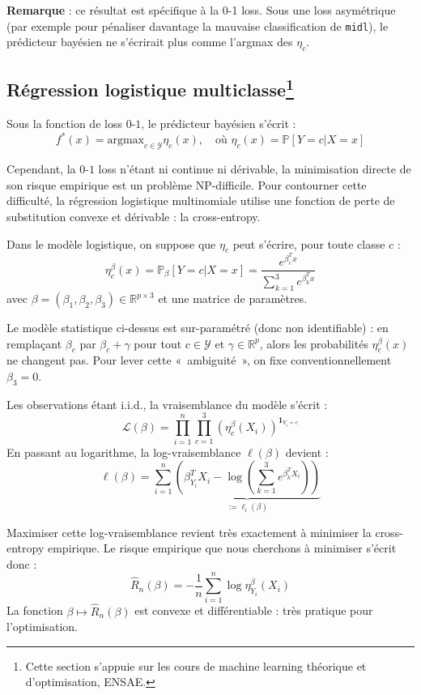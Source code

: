 \documentclass[a4paper,11pt]{paper}
\theoremstyle{plain}
\theoremstyle{definition}
\theoremstyle{remark}
\begin{document}
\textbf{Remarque} : ce résultat est spécifique à la 0-1 loss. Sous une loss asymétrique (par exemple pour pénaliser davantage la mauvaise classification de \texttt{midl}), le prédicteur bayésien ne s'écrirait plus comme l'argmax des $\eta_c$.


\subsection{Régression logistique multiclasse\texorpdfstring{\protect\footnote{Cette section s'appuie sur les cours de machine learning théorique et d'optimisation, ENSAE.}}{}}
\label{sec:logreg}

Sous la fonction de loss $0$-$1$, le prédicteur bayésien s'écrit :
$$f^*(x) = \text{argmax}_{c \in \mathcal{Y}} \eta_c(x), \quad \text{où } \eta_c(x) = \mathbb{P}[Y = c | X = x]$$

Cependant, la $0$-$1$ loss n'étant ni continue ni dérivable, la minimisation directe de son risque empirique est un problème NP-difficile. Pour contourner cette difficulté, la régression logistique multinomiale utilise une fonction de perte de substitution convexe et dérivable : la cross-entropy.

Dans le modèle logistique, on suppose que $\eta_c$ peut s'écrire, pour toute classe $c$ :
$$\eta_c^\beta(x) = \mathbb P_\beta[ Y = c| X =x ] = \dfrac{e^{\beta_c^T x}}{\sum_{k=1}^3e^{\beta_k^Tx}}$$
avec $\beta  = (\beta_1, \beta_2, \beta_3) \in \mathbb R^{p \times 3}$ et une matrice de paramètres.

Le modèle statistique ci-dessus est sur-paramétré (donc non identifiable) : en remplaçant $\beta_c$ par $\beta_c + \gamma$ pour tout $c \in \mathcal Y$ et $\gamma \in \mathbb R^p$, alors les probabilités $\eta_c^\beta(x)$ ne changent pas. Pour lever cette «~ambiguité~», on fixe conventionnellement $\beta_3 = 0$.

Les observations étant i.i.d., la vraisemblance du modèle s'écrit :
$$\mathcal{L}(\beta) = \prod_{i=1}^n \prod_{c=1}^3 (\eta_c^\beta(X_i))^{\mathbf{1}_{Y_i=c}}$$
En passant au logarithme, la log-vraisemblance $\ell(\beta)$ devient :
$$\ell(\beta) = \sum_{i=1}^n \underbrace{\left( \beta_{Y_i}^T X_i - \log\left(\sum_{k=1}^3 e^{\beta_k^T X_i}\right) \right)}_{:= \ell_i(\beta)}$$

Maximiser cette log-vraisemblance revient très exactement à minimiser la cross-entropy empirique. Le risque empirique que nous cherchons à minimiser s'écrit donc :
$$\hat{R}_n(\beta) = -\frac{1}{n} \sum_{i=1}^n \log \eta_{Y_i}^\beta(X_i)$$
La fonction $\beta \mapsto \hat{R}_n(\beta)$ est convexe et différentiable : très pratique pour l'optimisation.
\end{document}
